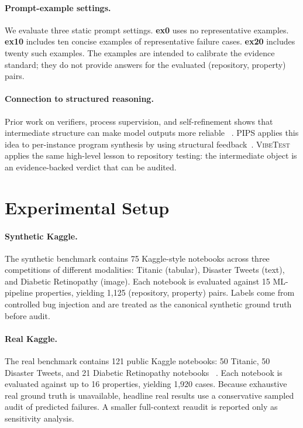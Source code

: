 \documentclass[11pt]{article}
\newcommand{\vibetest}{\textsc{VibeTest}}
\begin{document}
\paragraph{Prompt-example settings.}
We evaluate three static prompt settings.
\textbf{ex0} uses no representative examples.
\textbf{ex10} includes ten concise examples of representative failure cases.
\textbf{ex20} includes twenty such examples.
The examples are intended to calibrate the evidence standard; they do not
provide answers for the evaluated (repository, property) pairs.

\paragraph{Connection to structured reasoning.}
Prior work on verifiers, process supervision, and self-refinement shows that
intermediate structure can make model outputs more reliable
~\citep{cobbe2021verifier,lightman2024process,madaan2023selfrefine,weng2023selfverification}.
PIPS applies this idea to per-instance program synthesis by using structural
feedback~\citep{stein2025pips}.
\vibetest{} applies the same high-level lesson to repository testing: the
intermediate object is an evidence-backed verdict that can be audited.

\section{Experimental Setup}
\label{sec:setup}

\paragraph{Synthetic Kaggle.}
The synthetic benchmark contains 75 Kaggle-style notebooks across three
competitions of different modalities: Titanic (tabular), Disaster Tweets (text),
and Diabetic Retinopathy (image).
Each notebook is evaluated against 15 ML-pipeline properties, yielding 1,125
(repository, property) pairs.
Labels come from controlled bug injection and are treated as the canonical
synthetic ground truth before audit.

\paragraph{Real Kaggle.}
The real benchmark contains 121 public Kaggle notebooks: 50 Titanic, 50
Disaster Tweets, and 21 Diabetic Retinopathy notebooks
~\citep{kaggle_titanic,kaggle_disaster_tweets,kaggle_diabetic_retinopathy}.
Each notebook is evaluated against up to 16 properties, yielding 1,920 cases.
Because exhaustive real ground truth is unavailable, headline real results use
a conservative sampled audit of predicted failures.
A smaller full-context reaudit is reported only as sensitivity analysis.
\end{document}
